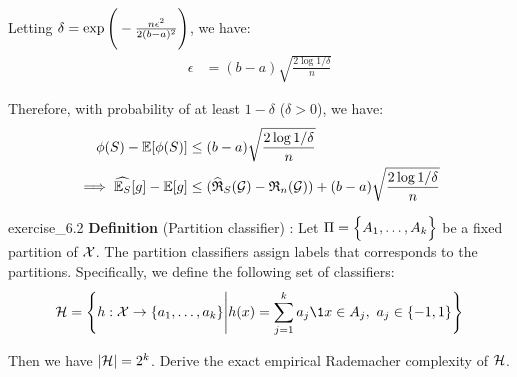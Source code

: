 \begin{solution*}
    \noindent Letting $\delta = \exp\Bigg( -\frac{n\epsilon^2}{2(b-a)^2} \Bigg)$, we have:
    \begin{align*}
        \epsilon &= (b-a)\sqrt{
            \frac{2\log 1/\delta}{n}
        }
    \end{align*}

    \noindent Therefore, with probability of at least $1-\delta$ ($\delta>0$), we have:
    \begin{align*}
        \phi(S) - \mathbb{E}[\phi(S)] &\le (b-a)\sqrt{
            \frac{2\log 1/\delta}{n}
        } \\
        \implies
        \widehat{\mathbb{E}_S}[g] - \mathbb{E}[g] &\le (\widehat{\mathfrak{R}}_S(\mathcal{G}) - \mathfrak{R}_n(\mathcal{G})) + (b-a)\sqrt{
            \frac{2\log 1/\delta}{n}
        }
    \end{align*}
\end{solution*}

\begin{exercise}{}{exercise_6.2}
    \textbf{Definition} (Partition classifier) : Let $\Pi=\Big\{ A_1, \dots, A_k \Big\}$ be a fixed partition of $\mathcal{X}$. The partition classifiers assign labels that corresponds to the partitions. Specifically, we define the following set of classifiers:
    \begin{align*}
        \Hf = \biggCurl{
            h : \X \to \{a_1, \dots, a_k\} \Bigg| h(x) = \sum_{j=1}^k a_j \1{x\in A_j}, \ a_j \in \{-1,1\}
        }
    \end{align*}

    \noindent Then we have $|\mathcal{H}|=2^k$. Derive the exact empirical Rademacher complexity of $\mathcal{H}$.
\end{exercise}

